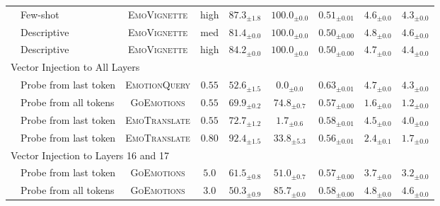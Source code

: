 \begin{table}[ht]
\begin{tabular}{@{}llcc|ccccc@{}}
\rowcolor{LightCyan} & Few-shot                  & \textsc{EmoVignette} & high & $\mathbf{87.3_{\scriptstyle\pm1.8}}$& $\mathbf{100.0_{\scriptstyle\pm0.0}}$& $0.51_{\scriptstyle\pm0.01}$& $4.6_{\scriptstyle\pm0.0}$& $4.3_{\scriptstyle\pm0.0}$\\
\rowcolor{WhiteColr} & Descriptive               & \textsc{EmoVignette} & med & $81.4_{\scriptstyle\pm0.0}$& $100.0_{\scriptstyle\pm0.0}$& $0.50_{\scriptstyle\pm0.00}$& $4.8_{\scriptstyle\pm0.0}$& $4.6_{\scriptstyle\pm0.0}$\\
\rowcolor{LightCyan} & Descriptive               & \textsc{EmoVignette} & high & $84.2_{\scriptstyle\pm0.0}$& $100.0_{\scriptstyle\pm0.0}$& $\mathbf{0.50_{\scriptstyle\pm0.00}}$& $4.7_{\scriptstyle\pm0.0}$& $4.4_{\scriptstyle\pm0.0}$\\
\midrule
\multicolumn{4}{l}{Vector Injection to All Layers} &\\
\rowcolor{LightCyan} & Probe from last token        &\textsc{EmotionQuery}&   $0.55$ & $52.6_{\scriptstyle\pm1.5}$& $0.0_{\scriptstyle\pm0.0}$& $0.63_{\scriptstyle\pm0.01}$& $4.7_{\scriptstyle\pm0.0}$& $4.3_{\scriptstyle\pm0.0}$\\
\rowcolor{WhiteColr} & Probe from all tokens        &\textsc{GoEmotions}&     $0.55$ & $69.9_{\scriptstyle\pm0.2}$& $74.8_{\scriptstyle\pm0.7}$& $0.57_{\scriptstyle\pm0.00}$& $1.6_{\scriptstyle\pm0.0}$& $1.2_{\scriptstyle\pm0.0}$\\
\rowcolor{LightCyan} & Probe from last token        &\textsc{EmoTranslate}&   $0.55$ & $72.7_{\scriptstyle\pm1.2}$& $1.7_{\scriptstyle\pm0.6}$& $0.58_{\scriptstyle\pm0.01}$& $4.5_{\scriptstyle\pm0.0}$& $4.0_{\scriptstyle\pm0.0}$\\
\rowcolor{WhiteColr} & Probe from last token        &\textsc{EmoTranslate}&   $0.80$ & $92.4_{\scriptstyle\pm1.5}$& $33.8_{\scriptstyle\pm5.3}$& $0.56_{\scriptstyle\pm0.01}$& $2.4_{\scriptstyle\pm0.1}$& $1.7_{\scriptstyle\pm0.0}$\\
\midrule
\multicolumn{4}{l}{Vector Injection to Layers 16 and 17} & \\
\rowcolor{LightCyan} & Probe from last token        &\textsc{GoEmotions}&   $5.0$ & $61.5_{\scriptstyle\pm0.8}$& $51.0_{\scriptstyle\pm0.7}$& $0.57_{\scriptstyle\pm0.00}$& $3.7_{\scriptstyle\pm0.0}$& $3.2_{\scriptstyle\pm0.0}$\\
\rowcolor{WhiteColr} & Probe from all tokens        &\textsc{GoEmotions}&   $3.0$ & $50.3_{\scriptstyle\pm0.9}$& $85.7_{\scriptstyle\pm0.0}$& $0.58_{\scriptstyle\pm0.00}$& $4.8_{\scriptstyle\pm0.0}$& $4.6_{\scriptstyle\pm0.0}$\\

\end{tabular}
\end{table}
